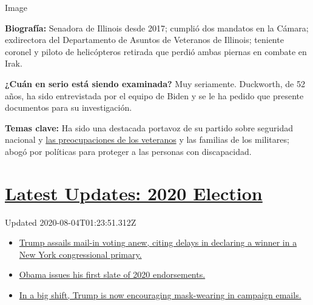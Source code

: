 Image

\textbf{Biografía:} Senadora de Illinois desde 2017; cumplió dos
mandatos en la Cámara; exdirectora del Departamento de Asuntos de
Veteranos de Illinois; teniente coronel y piloto de helicópteros
retirada que perdió ambas piernas en combate en Irak.

\textbf{¿Cuán en serio está siendo examinada?} Muy seriamente.
Duckworth, de 52 años, ha sido entrevistada por el equipo de Biden y se
le ha pedido que presente documentos para su investigación.

\textbf{Temas clave:} Ha sido una destacada portavoz de su partido sobre
seguridad nacional y
\href{https://www.nytimes.com/2018/03/26/us/army-veteran-deported.html}{las
preocupaciones de los veteranos} y las familias de los militares; abogó
por políticas para proteger a las personas con discapacidad.

\hypertarget{latest-updates-2020-election}{%
\section{\texorpdfstring{\href{https://www.nytimes.com/2020/08/03/us/elections/biden-vs-trump.html?action=click\&pgtype=Article\&state=default\&region=MAIN_CONTENT_1\&context=storylines_live_updates}{Latest
Updates: 2020
Election}}{Latest Updates: 2020 Election}}\label{latest-updates-2020-election}}

Updated 2020-08-04T01:23:51.312Z

\begin{itemize}
\tightlist
\item
  \href{https://www.nytimes.com/2020/08/03/us/elections/biden-vs-trump.html?action=click\&pgtype=Article\&state=default\&region=MAIN_CONTENT_1\&context=storylines_live_updates\#link-6494b448}{Trump
  assails mail-in voting anew, citing delays in declaring a winner in a
  New York congressional primary.}
\item
  \href{https://www.nytimes.com/2020/08/03/us/elections/biden-vs-trump.html?action=click\&pgtype=Article\&state=default\&region=MAIN_CONTENT_1\&context=storylines_live_updates\#link-3de249e6}{Obama
  issues his first slate of 2020 endorsements.}
\item
  \href{https://www.nytimes.com/2020/08/03/us/elections/biden-vs-trump.html?action=click\&pgtype=Article\&state=default\&region=MAIN_CONTENT_1\&context=storylines_live_updates\#link-54e34d20}{In
  a big shift, Trump is now encouraging mask-wearing in campaign
  emails.}
\end{itemize}

